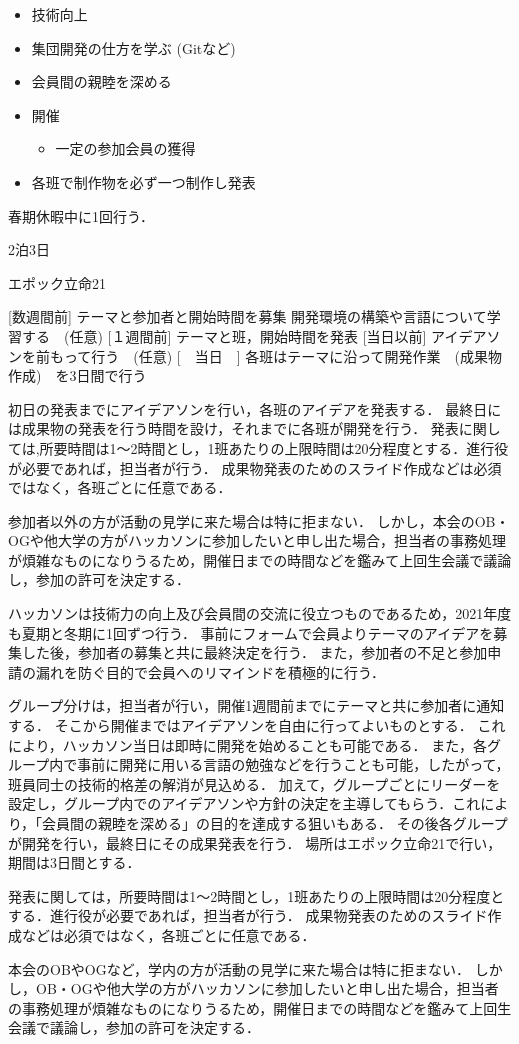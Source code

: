 \begin{itemize}
    \item 技術向上
    \item 集団開発の仕方を学ぶ (Gitなど)
    \item 会員間の親睦を深める
    \item 開催
    \begin{itemize}
        \item 一定の参加会員の獲得
    \end{itemize}
    \item 各班で制作物を必ず一つ制作し発表
\end{itemize}


春期休暇中に1回行う．

2泊3日

エポック立命21

[数週間前]	テーマと参加者と開始時間を募集
           開発環境の構築や言語について学習する　(任意)
[１週間前]	テーマと班，開始時間を発表
[当日以前]	アイデアソンを前もって行う　(任意)
[　当日　]	各班はテーマに沿って開発作業　(成果物作成)　を3日間で行う

初日の発表までにアイデアソンを行い，各班のアイデアを発表する．
最終日には成果物の発表を行う時間を設け，それまでに各班が開発を行う．
発表に関しては,所要時間は1～2時間とし，1班あたりの上限時間は20分程度とする．進行役が必要であれば，担当者が行う．
成果物発表のためのスライド作成などは必須ではなく，各班ごとに任意である．


参加者以外の方が活動の見学に来た場合は特に拒まない．
しかし，本会のOB・OGや他大学の方がハッカソンに参加したいと申し出た場合，担当者の事務処理が煩雑なものになりうるため，開催日までの時間などを鑑みて上回生会議で議論し，参加の許可を決定する．


ハッカソンは技術力の向上及び会員間の交流に役立つものであるため，2021年度も夏期と冬期に1回ずつ行う．
事前にフォームで会員よりテーマのアイデアを募集した後，参加者の募集と共に最終決定を行う．
また，参加者の不足と参加申請の漏れを防ぐ目的で会員へのリマインドを積極的に行う．


グループ分けは，担当者が行い，開催1週間前までにテーマと共に参加者に通知する．
そこから開催まではアイデアソンを自由に行ってよいものとする．
これにより，ハッカソン当日は即時に開発を始めることも可能である．
また，各グループ内で事前に開発に用いる言語の勉強などを行うことも可能，したがって，班員同士の技術的格差の解消が見込める．
加えて，グループごとにリーダーを設定し，グループ内でのアイデアソンや方針の決定を主導してもらう．これにより，「会員間の親睦を深める」の目的を達成する狙いもある．
その後各グループが開発を行い，最終日にその成果発表を行う．
場所はエポック立命21で行い，期間は3日間とする．

発表に関しては，所要時間は1～2時間とし，1班あたりの上限時間は20分程度とする．進行役が必要であれば，担当者が行う．
成果物発表のためのスライド作成などは必須ではなく，各班ごとに任意である．

本会のOBやOGなど，学内の方が活動の見学に来た場合は特に拒まない．
しかし，OB・OGや他大学の方がハッカソンに参加したいと申し出た場合，担当者の事務処理が煩雑なものになりうるため，開催日までの時間などを鑑みて上回生会議で議論し，参加の許可を決定する．

